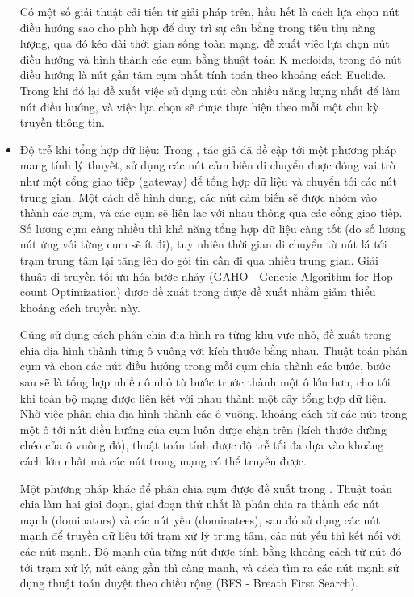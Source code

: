 \documentclass{hust}
\begin{document}
\begin{itemize}
	
	Có một số giải thuật cải tiến từ giải pháp trên, hầu hết là cách lựa chọn nút điều hướng sao cho phù hợp để duy trì sự cân bằng trong tiêu thụ năng lượng, qua đó kéo dài thời gian sống toàn mạng. \cite{bakaraniya2013k} đề xuất việc lựa chọn nút điều hướng và hình thành các cụm bằng thuật toán K-medoids, trong đó nút điều hướng là nút gần tâm cụm nhất tính toán theo khoảng cách Euclide. Trong khi đó \cite{arumugam2015ee} lại đề xuất việc sử dụng nút còn nhiều năng lượng nhất để làm nút điều hướng, và việc lựa chọn sẽ được thực hiện theo mỗi một chu kỳ truyền thông tin.
	
	\item Độ trễ khi tổng hợp dữ liệu: Trong \cite{youssef2007intelligent}, tác giả đã đề cập tới một phương pháp mang tính lý thuyết, sử dụng các nút cảm biến di chuyển được đóng vai trò như một cổng giao tiếp (gateway) để tổng hợp dữ liệu và chuyển tới các nút trung gian. Một cách dễ hình dung, các nút cảm biến sẽ được nhóm vào thành các cụm, và các cụm sẽ liên lạc với nhau thông qua các cổng giao tiếp. Số lượng cụm càng nhiều thì khả năng tổng hợp dữ liệu càng tốt (do số lượng nút ứng với từng cụm sẽ ít đi), tuy nhiên thời gian di chuyển từ nút lá tới trạm trung tâm lại tăng lên do gói tin cần đi qua nhiều trung gian. Giải thuật di truyền tối ưu hóa bước nhảy (GAHO - Genetic Algorithm for Hop count Optimization) được đề xuất trong \cite{youssef2007intelligent} được đề xuất nhằm giảm thiểu khoảng cách truyền này.
	
	
	Cũng sử dụng cách phân chia địa hình ra từng khu vực nhỏ, đề xuất trong \cite{wang2012minimizing} chia địa hình thành từng ô vuông với kích thước bằng nhau. Thuật toán phân cụm và chọn các nút điều hướng trong mỗi cụm chia thành các bước, bước sau sẽ là tổng hợp nhiều ô nhỏ từ bước trước thành một ô lớn hơn, cho tới khi toàn bộ mạng được liên kết với nhau thành một cây tổng hợp dữ liệu. Nhờ việc phân chia địa hình thành các ô vuông, khoảng cách từ các nút trong một ô tới nút điều hướng của cụm luôn được chặn trên (kích thước đường chéo của ô vuông đó), thuật toán tính được độ trễ tối đa dựa vào khoảng cách lớn nhất mà các nút trong mạng có thể truyền được.
	
	
	Một phương pháp khác để phân chia cụm được đề xuất trong \cite{xu2010delay}. Thuật toán chia làm hai giai đoạn, giai đoạn thứ nhất là phân chia ra thành các nút mạnh (dominators) và các nút yếu (dominatees), sau đó sử dụng các nút mạnh để truyền dữ liệu tới trạm xử lý trung tâm, các nút yếu thì kết nối với các nút mạnh. Độ mạnh của từng nút được tính bằng khoảng cách từ nút đó tới trạm xử lý, nút càng gần thì càng mạnh, và cách tìm ra các nút mạnh sử dụng thuật toán duyệt theo chiều rộng (BFS - Breath First Search).
	

\end{itemize}
\end{document}
